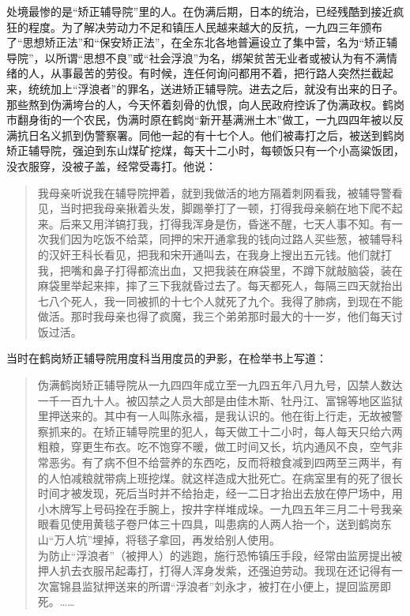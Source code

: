 处境最惨的是“矫正辅导院”里的人。在伪满后期，日本的统治，已经残酷到接近疯狂的程度。为了解决劳动力不足和镇压人民越来越大的反抗，一九四三年颁布了“思想矫正法”和“保安矫正法”，在全东北各地普遍设立了集中营，名为“矫正辅导院”，以所谓“思想不良”或“社会浮浪”为名，绑架贫苦无业者或被认为有不满情绪的人，从事最苦的劳役。有时候，连任何询问都用不着，把行路人突然拦截起来，统统加上“浮浪者”的罪名，送进矫正辅导院。进去之后，就没有出来的日子。那些熬到伪满垮台的人，今天怀着刻骨的仇恨，向人民政府控诉了伪满政权。鹤岗市翻身街的一个农民，伪满时原在鹤岗“新开基满洲土木”做工，一九四四年被以反满抗日名义抓到伪警察署。同他一起的有十七个人。他们被毒打之后，被送到鹤岗矫正辅导院，强迫到东山煤矿挖煤，每天十二小时，每顿饭只有一个小高粱饭团，没衣服穿，没被子盖，经常受毒打。他说：\\

\begin{quote}
	我母亲听说我在辅导院押着，就到我做活的地方隔着刺网看我，被辅导警看见，当时把我母亲揪着头发，脚踢拳打了一顿，打得我母亲躺在地下爬不起来。后来又用洋镐打我，打得我浑身是伤，昏迷不醒，七天人事不知。有一次我们因为吃饭不给菜，同押的宋开通拿我的钱向过路人买些葱，被辅导科的汉奸王科长看见，把我和宋开通叫去，在我身上搜出五元钱。他们就打我，把嘴和鼻子打得都流出血，又把我装在麻袋里，不蹲下就敲脑袋，装在麻袋里举起来摔，摔了三下我就昏过去了。每天都死人，每隔三四天就抬出七八个死人，我一同被抓的十七个人就死了九个。我得了肺病，到现在不能做活。那时我母亲也得了疯魔，我三个弟弟那时最大的十一岁，他们每天讨饭过活。\\
\end{quote}

当时在鹤岗矫正辅导院用度科当用度员的尹影，在检举书上写道：\\

\begin{quote}
	伪满鹤岗矫正辅导院从一九四四年成立至一九四五年八月九号，囚禁人数达一千一百九十人。被囚禁之人员大部是由佳木斯、牡丹江、富锦等地区监狱里押送来的。其中有一人叫陈永福，是我认识的。他在街上行走，无故被警察抓来的。在矫正辅导院里的犯人，每天做工十二小时，每人每天只给六两粗粮，穿更生布衣。吃不饱穿不暖，做工时间又长，坑内通风不良，空气非常恶劣。有了病不但不给营养的东西吃，反而将粮食减到四两至三两半，有的人怕减粮就带病上班挖煤。就这样造成大批死亡。在病室里有的死了很长时间才被发现，死后当时并不给抬走，经一二日才抬出去放在停尸场中，用小木牌写上号码拴在手腕上，按井字样堆成垛。一九四五年三月二十号我亲眼看见使用黄毯子卷尸体三十四具，叫患病的人两人抬一个，送到鹤岗东山“万人坑”埋掉，将毯子拿回，再发给别人使用。\\

为防止“浮浪者”（被押人）的逃跑，施行恐怖镇压手段，经常由监房提出被押人扒去衣服吊起毒打，打得人浑身发紫，还强迫劳动。我现在还记得有一次富锦县监狱押送来的所谓“浮浪者”刘永才，被打在小便上，提回监房即死。……\\
\end{quote}

